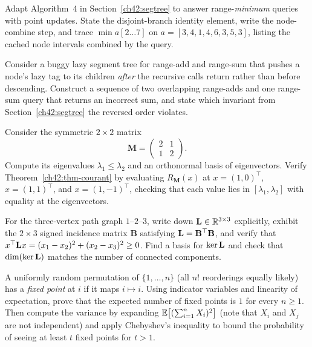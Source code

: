 \begin{exercise}
Adapt Algorithm~4 in Section~\ref{ch42:segtree} to answer range-\emph{minimum} queries with point updates. State the disjoint-branch identity element, write the node-combine step, and trace $\min a[2\dots 7]$ on $a = [3,4,1,4,6,3,5,3]$, listing the cached node intervals combined by the query.
\end{exercise}

\begin{exercise}
Consider a buggy lazy segment tree for range-add and range-sum that pushes a node's lazy tag to its children \emph{after} the recursive calls return rather than before descending. Construct a sequence of two overlapping range-adds and one range-sum query that returns an incorrect sum, and state which invariant from Section~\ref{ch42:segtree} the reversed order violates.
\end{exercise}

\begin{exercise}
Consider the symmetric $2\times 2$ matrix
\[
  \mathbf{M} = \begin{pmatrix} 2 & 1 \\ 1 & 2 \end{pmatrix}.
\]
Compute its eigenvalues $\lambda_1 \le \lambda_2$ and an orthonormal basis of eigenvectors. Verify Theorem~\ref{ch42:thm-courant} by evaluating $R_{\mathbf{M}}(x)$ at $x = (1,0)^\top$, $x = (1,1)^\top$, and $x = (1,-1)^\top$, checking that each value lies in $[\lambda_1, \lambda_2]$ with equality at the eigenvectors.
\end{exercise}

\begin{exercise}
For the three-vertex path graph $1$--$2$--$3$, write down $\mathbf{L} \in \mathbb{R}^{3\times 3}$ explicitly, exhibit the $2\times 3$ signed incidence matrix $\mathbf{B}$ satisfying $\mathbf{L} = \mathbf{B}^\top\mathbf{B}$, and verify that $x^\top\mathbf{L} x = (x_1 - x_2)^2 + (x_2 - x_3)^2 \ge 0$. Find a basis for $\ker\mathbf{L}$ and check that $\dim(\ker\mathbf{L})$ matches the number of connected components.
\end{exercise}

\begin{exercise}
\label{ch42:ex-perm-fixed}
A uniformly random permutation of $\{1,\dots,n\}$ (all $n!$ reorderings equally likely) has a \emph{fixed point} at $i$ if it maps $i \mapsto i$. Using indicator variables and linearity of expectation, prove that the expected number of fixed points is $1$ for every $n \ge 1$. Then compute the variance by expanding $\operatorname{\mathbb{E}}\bigl[(\sum_{i=1}^n X_i)^2\bigr]$ (note that $X_i$ and $X_j$ are not independent) and apply Chebyshev's inequality to bound the probability of seeing at least $t$ fixed points for $t > 1$.
\end{exercise}


